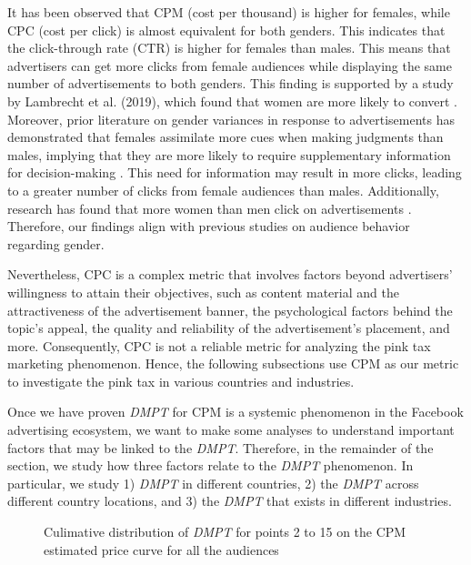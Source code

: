 \documentclass[twocolumn]{bmcart}\usepackage{lineno}
\begin{document}
It has been observed that CPM (cost per thousand) is higher for females, while CPC (cost per click) is almost equivalent for both genders. This indicates that the click-through rate (CTR) is higher for females than males.\color{blue} This means that advertisers can get more clicks from female audiences while displaying the same number of advertisements to both genders. This finding is supported by a study by Lambrecht et al. (2019), which found that women are more likely to convert \cite{lambrecht2019algorithmic}. \color{black}
Moreover, prior literature on gender variances in response to advertisements has demonstrated that females assimilate more cues when making judgments than males, implying that they are more likely to require supplementary information for decision-making \cite{keshari2014consumer}. This need for information may result in more clicks, leading to a greater number of clicks from female audiences than males. Additionally, research has found that more women than men click on advertisements \cite{marketingprofs}. Therefore, our findings align with previous studies on audience behavior regarding gender.





Nevertheless, CPC is a complex metric that involves factors beyond advertisers' willingness to attain their objectives, such as content material and the attractiveness of the advertisement banner, the psychological factors behind the topic's appeal, the quality and reliability of the advertisement's placement, and more. Consequently, CPC is not a reliable metric for analyzing the pink tax marketing phenomenon. Hence, the following subsections use CPM as our metric to investigate the pink tax in various countries and industries. 



Once we have proven \emph{DMPT} for CPM is a systemic phenomenon in the Facebook advertising ecosystem, we want to make some analyses to understand important factors that may be linked to the \emph{DMPT}. Therefore, in the remainder of the section, we study how three factors relate to the \emph{DMPT} phenomenon. In particular, we study 1) \emph{DMPT} in different countries, 2) the \emph{DMPT} across different country locations, and 3) the \emph{DMPT} that exists in different industries.



\begin{figure}[h!]
\color{blue}
    \centering
\caption{Culimative distribution of \emph{DMPT} for points 2 to 15 on the CPM estimated price curve for all the audiences }
    \label{fig:CPMPointsAll}
\end{figure}
    
\end{document}

